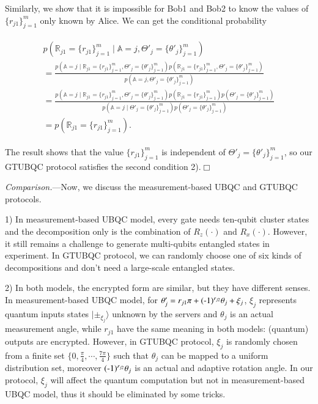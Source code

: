 \documentclass[aps,pra,showpacs,twocolumn,superscriptaddress]{revtex4-1}
\begin{document}
Similarly, we show that it is impossible for Bob1 and Bob2 to know the values of $\{r_{j1}\}_{j=1}^m$ only known by Alice. We can get the conditional probability
\begin{tiny}
\begin{eqnarray*}
\begin{array}{l}
\displaystyle p(\mathbb{R}_{j1}=\{r_{j1}\}_{j=1}^m \mid \mathbb{A}=j,\Theta'_j=\{\theta'_j\}_{j=1}^m)\\
\displaystyle=\frac{p(\mathbb{A}=j\mid \mathbb{R}_{j1}=\{r_{j1}\}_{j=1}^m,\Theta'_j=\{\theta'_j\}_{j=1}^m)p(\mathbb{R}_{j1}=\{r_{j1}\}_{j=1}^m,\Theta'_j=\{\theta'_j\}_{j=1}^m)}{p(\mathbb{A}=j,\Theta'_j=\{\theta'_j\}_{j=1}^m)}\\
\displaystyle =\frac{p(\mathbb{A}=j\mid \mathbb{R}_{j1}=\{r_{j1}\}_{j=1}^m,\Theta'_j=\{\theta'_j\}_{j=1}^m)p(\mathbb{R}_{j1}=\{r_{j1}\}_{j=1}^m)p(\Theta'_j=\{\theta'_j\}_{j=1}^m )}{p(\mathbb{A}=j\mid\Theta'_j=\{\theta'_j\}_{j=1}^m)p(\Theta'_j=\{\theta'_j\}_{j=1}^m)}\\
\displaystyle =p(\mathbb{R}_{j1}=\{r_{j1}\}_{j=1}^m).
\end{array}
\end{eqnarray*}
\end{tiny}
The result shows that the value $\{r_{j1}\}_{j=1}^m$ is independent of $\Theta'_j=\{\theta'_j\}_{j=1}^m$, so our GTUBQC protocol satisfies the second condition 2).$\Box$

\emph{Comparison.}---Now, we discuss the measurement-based UBQC and GTUBQC protocols.

1) In measurement-based UBQC model, every gate needs ten-qubit cluster states and the decomposition only is the combination of $R_z(\cdot)$ and $R_x(\cdot)$. However, it still remains a challenge to generate multi-qubits entangled states in experiment. In GTUBQC protocol, we can randomly choose one of six kinds of decompositions and don't need a large-scale entangled states.

2) In both models, the encrypted form are similar, but they have different senses. In measurement-based UBQC model, for $\theta'_j=r_{j1}\pi+(\textnormal{-}1)^{r_{j2}}\theta_j+\xi_j$, $\xi_j$ represents quantum inputs states $|\pm_{\xi_j}\rangle$ unknown by the servers and $\theta_j$ is an actual measurement angle, while $r_{j1}$ have the same meaning in both models: (quantum) outputs are encrypted. However, in GTUBQC protocol, $\xi_j$ is randomly chosen from a finite set $\{0, \frac{\pi}{4}, \cdots, \frac{7\pi}{4}\}$ such that $\theta_j$ can be mapped to a uniform distribution set, moreover $(\textnormal{-}1)^{r_{j2}}\theta_j$ is an actual and adaptive rotation angle. In our protocol, $\xi_j$ will affect the quantum computation but not in measurement-based UBQC model, thus it should be eliminated by some tricks.
\end{document}
